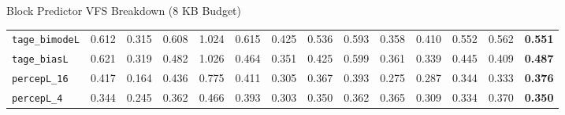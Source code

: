 \documentclass[aspectratio=169]{beamer}
\begin{document}
\begin{frame}[noframenumbering]{Block Predictor VFS Breakdown (8 KB Budget)}
\begin{table}
{\begin{tabular}{|lcccccccccccc|c|}
        \texttt{tage\_bimodeL} & 0.612 & 0.315 & 0.608 & 1.024 & 0.615 & 0.425 & 0.536 & 0.593 & 0.358 & 0.410 & 0.552 & 0.562 & \textbf{0.551} \\
        \texttt{tage\_biasL} & 0.621 & 0.319 & 0.482 & 1.026 & 0.464 & 0.351 & 0.425 & 0.599 & 0.361 & 0.339 & 0.445 & 0.409 & \textbf{0.487} \\
        \texttt{percepL\_16} & 0.417 & 0.164 & 0.436 & 0.775 & 0.411 & 0.305 & 0.367 & 0.393 & 0.275 & 0.287 & 0.344 & 0.333 & \textbf{0.376} \\
        \texttt{percepL\_4} & 0.344 & 0.245 & 0.362 & 0.466 & 0.393 & 0.303 & 0.350 & 0.362 & 0.365 & 0.309 & 0.334 & 0.370 & \textbf{0.350} \\
        \hline
        \end{tabular}%
        }
    \end{table}
\end{frame}
\end{document}
